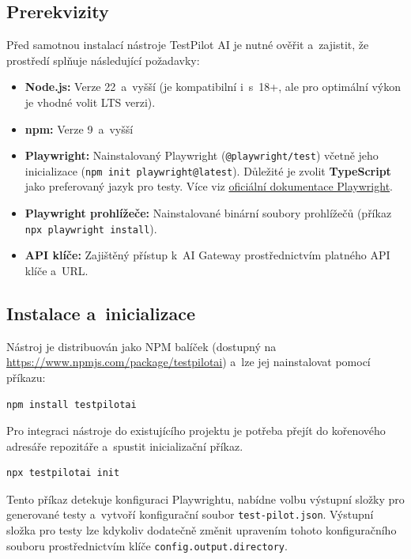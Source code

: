 \documentclass[czech, ing, kiv, he, iso690numb, viewonly]{fasthesis}
\begin{document}
\subsection*{Prerekvizity}
Před samotnou instalací nástroje TestPilot AI je nutné ověřit a~zajistit,
že prostředí splňuje následující požadavky:
\begin{itemize}
    \item \textbf{Node.js:} Verze 22~a~vyšší (je kompatibilní i~s~18+, ale pro optimální výkon je vhodné volit LTS verzi). 
    \item \textbf{npm:} Verze 9~a~vyšší 
    \item \textbf{Playwright:} Nainstalovaný Playwright (\texttt{@playwright/test}) včetně jeho inicializace (\texttt{npm init playwright@latest}).
    Důležité je zvolit \textbf{TypeScript} jako preferovaný jazyk pro testy. Více viz 
    \href{https://playwright.dev/docs/intro#installing-playwright}{oficiální dokumentace Playwright}.
    \item \textbf{Playwright prohlížeče:} Nainstalované binární soubory prohlížečů (příkaz \texttt{npx playwright install}).
    \item \textbf{API klíče:} Zajištěný přístup k~AI Gateway prostřednictvím platného API klíče a~URL.  
\end{itemize}

\subsection*{Instalace a~inicializace}
Nástroj je distribuován jako NPM balíček (dostupný na \url{https://www.npmjs.com/package/testpilotai}) a~lze jej nainstalovat pomocí příkazu:
\begin{lstlisting}[language=bash, basicstyle=\ttfamily\small]
npm install testpilotai
\end{lstlisting}

Pro integraci nástroje do existujícího projektu je potřeba přejít do kořenového 
adresáře repozitáře a~spustit inicializační příkaz. 
\begin{lstlisting}[language=bash, basicstyle=\ttfamily\small]
npx testpilotai init
\end{lstlisting}
Tento příkaz detekuje 
konfiguraci Playwrightu, nabídne volbu výstupní složky pro generované testy 
a~vytvoří konfigurační soubor \texttt{test-pilot.json}.
Výstupní složka pro testy lze kdykoliv dodatečně změnit upravením tohoto konfiguračního souboru
prostřednictvím klíče \texttt{config.output.directory}.
\end{document}
